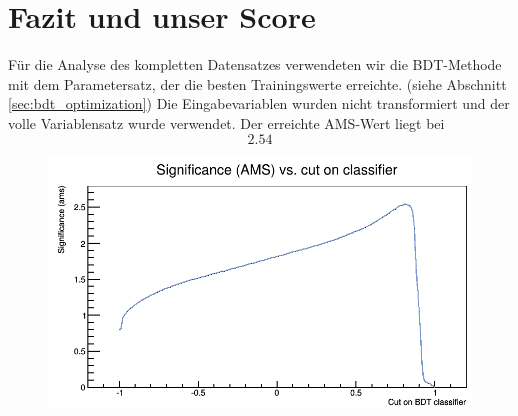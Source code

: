 \section{Fazit und unser Score}
Für die Analyse des kompletten Datensatzes verwendeten wir die BDT-Methode mit dem Parametersatz, der die besten Trainingswerte erreichte. (siehe Abschnitt \ref{sec:bdt_optimization}) Die Eingabevariablen wurden nicht transformiert und der volle Variablensatz wurde verwendet. Der erreichte AMS-Wert liegt bei
\begin{equation}
2.54
\end{equation}

\begin{figure}[htp]
\begin{center}
  \includegraphics[width=0.7\linewidth]{sections/conclusion/AMS_vs_Cut_cropped.png}
 \caption[]{}
\label{fig:bdt_Shrinkage}
\end{center}
\end{figure}